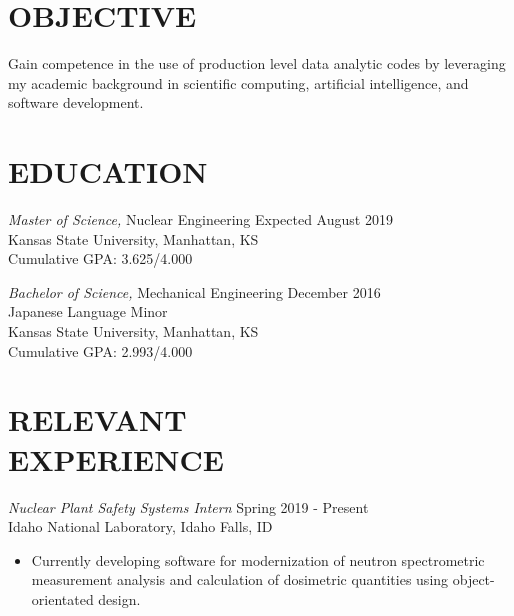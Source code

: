 \documentclass[margin, 10pt]{res} %
\begin{document}
\begin{resume}
 
\section{OBJECTIVE}  

Gain competence in the use of production level data analytic codes by leveraging my academic background in scientific computing, artificial intelligence, and software development.

\section{EDUCATION}

{\sl Master of Science,} Nuclear Engineering \hfill Expected August 2019\\
Kansas State University, Manhattan, KS \\
Cumulative GPA: 3.625/4.000

{\sl Bachelor of Science,} Mechanical Engineering \hfill December 2016 \\
Japanese Language Minor \\
Kansas State University, Manhattan, KS \\
Cumulative GPA: 2.993/4.000


\section{RELEVANT \\ EXPERIENCE}


{\sl Nuclear Plant Safety Systems Intern} \hfill Spring 2019 - Present \\
Idaho National Laboratory, Idaho Falls, ID
\begin{itemize}
    \item Currently developing software for modernization of neutron spectrometric measurement analysis and calculation of dosimetric quantities using object-orientated design.
\end{itemize}


\end{resume}
\end{document}

